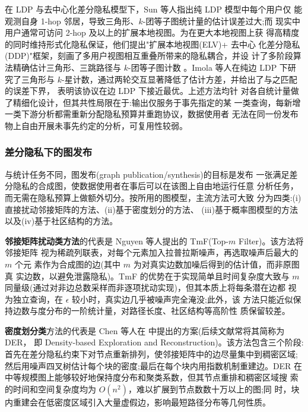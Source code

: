 \par 在 LDP 与去中心化差分隐私模型下，Sun 等人指出纯 LDP 模型中每个用户仅
能观测自身 1-hop 邻居，导致三角形、$k$-团等子图统计量的估计误差过大;而
现实中用户通常可访问 2-hop 及以上的扩展本地视图。为在更大本地视图上获
得高精度的同时维持形式化隐私保证，他们提出"扩展本地视图(ELV)+ 去中心
化差分隐私(DDP)"框架，刻画了多用户视图相互重叠所带来的隐私耦合，并设
计了多阶段算法精确估计三角形、三跳路径与 $k$-团等子图计数
\cite{sun_analyzing_2019}。Imola 等人在纯边 LDP 下研究了三角形与
$k$-星计数，通过两轮交互显著降低了估计方差，并给出了与之匹配的误差下界，
表明该协议在边 LDP 下接近最优\cite{imola_locally_2021}。上述方法均针
对各自统计量做了精细化设计，但其共性局限在于:输出仅服务于事先指定的某
一类查询，每新增一类下游分析都需重新分配隐私预算并重跑协议，数据使用者
无法在同一份发布物上自由开展未事先约定的分析，可复用性较弱。

\subsubsection{差分隐私下的图发布}

\par 与统计任务不同，图发布(graph publication/synthesis)的目标是发布
一张满足差分隐私的合成图，使数据使用者在事后可以在该图上自由地运行任意
分析任务，而无需在隐私预算上做额外切分。按所用的图模型，主流方法可大致
分为四类:(i)直接扰动邻接矩阵的方法、(ii)基于密度划分的方法、
(iii)基于概率图模型的方法以及(iv)基于社区结构的方法。

\par \textbf{邻接矩阵扰动类方法}的代表是 Nguyen 等人提出的
TmF(Top-$m$ Filter)\cite{nguyen_differentially_2015}。该方法将邻接矩阵
视为稀疏列联表，对每个元素加入拉普拉斯噪声，再选取噪声后最大的 $m$ 个元
素作为合成图的边(其中 $m$ 为对真实边数加噪后得到的估计值，而非原图真
实边数，以避免泄露隐私)。TmF 的优势在于实现简单且时间复杂度大致与 $m$
同量级(通过对非边总数采样而非逐项扰动实现)，但其本质上将每条潜在边都
视为独立查询，在 $\epsilon$ 较小时，真实边几乎被噪声完全淹没;此外，该
方法只能近似保持边数与度分布的一阶统计量，对路径长度、社区结构等高阶性
质保留较差。

\par \textbf{密度划分类}方法的代表是 Chen 等人在
\cite{chen_correlated_2014} 中提出的方案(后续文献常将其简称为 DER，
即 Density-based Exploration and Reconstruction)。该方法包含三个阶段:
首先在差分隐私约束下对节点重新排列，使邻接矩阵中的边尽量集中到稠密区域;
然后用噪声四叉树估计每个块的密度;最后在每个块内用指数机制重建边。DER
在中等规模图上能够较好地保持度分布和聚类系数，但其节点重排和稠密区域搜
索的时间和空间复杂度均为 $O(n^2)$，难以扩展到节点数数十万以上的图;同
时，块内重建会在低密度区域引入大量虚假边，影响最短路径分布等几何性质。

